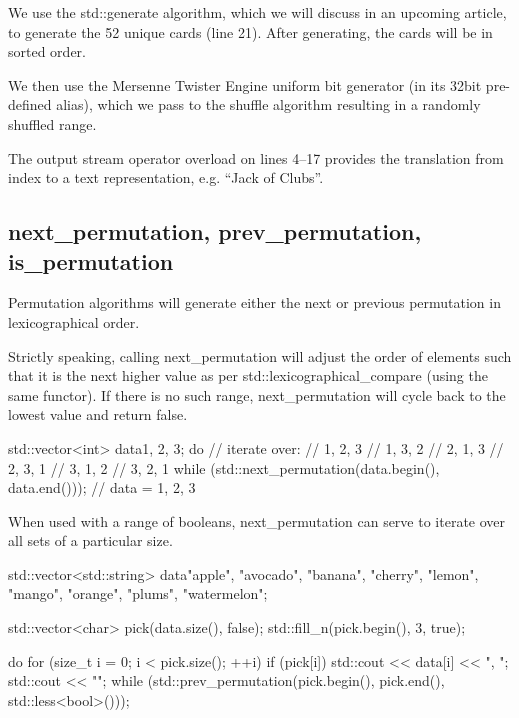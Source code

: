 We use the std::generate algorithm, which we will discuss in an upcoming article, to generate the 52 unique cards (line 21). After generating, the cards will be in sorted order.

We then use the Mersenne Twister Engine uniform bit generator (in its 32bit pre-defined alias), which we pass to the shuffle algorithm resulting in a randomly shuffled range.

The output stream operator overload on lines 4–17 provides the translation from index to a text representation, e.g. “Jack of Clubs”.

\subsection{next\_permutation, prev\_permutation, is\_permutation}

Permutation algorithms will generate either the next or previous permutation in lexicographical order.



Strictly speaking, calling next\_permutation will adjust the order of elements such that it is the next higher value as per std::lexicographical\_compare (using the same functor). If there is no such range, next\_permutation will cycle back to the lowest value and return false.

\begin{box-note}
\begin{cppcode}
std::vector<int> data{1, 2, 3};
do {
    // iterate over:
    // 1, 2, 3
    // 1, 3, 2
    // 2, 1, 3
    // 2, 3, 1
    // 3, 1, 2
    // 3, 2, 1
} while (std::next_permutation(data.begin(), data.end()));
// data = {1, 2, 3}
\end{cppcode}
\end{box-note}

When used with a range of booleans, next\_permutation can serve to iterate over all sets of a particular size.

\begin{box-note}
\begin{cppcode}
std::vector<std::string> data{"apple", "avocado", "banana", 
  "cherry", "lemon", "mango", 
  "orange", "plums", "watermelon"};

std::vector<char> pick(data.size(), false);
std::fill_n(pick.begin(), 3, true);

do {
    for (size_t i = 0; i < pick.size(); ++i) {
        if (pick[i])
            std::cout << data[i] << ", ";
    }
    std::cout << "\n";
} while (std::prev_permutation(pick.begin(), pick.end(), std::less<bool>()));
\end{cppcode}
\end{box-note}

